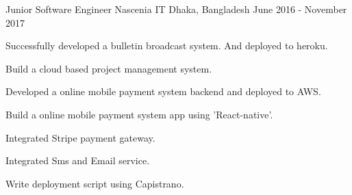 \begin{cventries}
\cventry
    {Junior Software Engineer}
    {Nascenia IT}
    {Dhaka, Bangladesh}
    {June 2016 - November 2017}
    {
      \begin{cvitemsNumber}[Responsibilities:]
        \vspace{1mm}
        \item {Successfully developed a bulletin broadcast system. And deployed to heroku.}
        \vspace{1mm}
        \item {Build a cloud based project management system.}
        \vspace{1mm}
        \item {Developed a online mobile payment system backend and deployed to
                AWS.}
        \vspace{1mm}
        \item {Build a online mobile payment system app using 'React-native'.}
        \vspace{1mm}
        \item {Integrated Stripe payment gateway.}
        \vspace{1mm}
        \item {Integrated Sms and Email service.}
        \vspace{1mm}
        \item {Write deployment script using Capistrano.}
        \vspace{1mm}
      \end{cvitemsNumber}
    }
\end{cventries}
